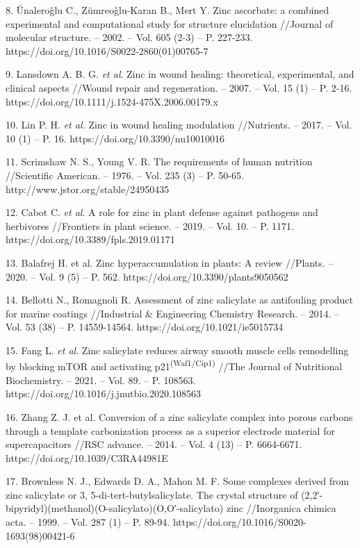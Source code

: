 \begin{noparindent}
8.
  Ünaleroǧlu C., Zümreoǧlu-Karan B., Mert Y. Zinc ascorbate: a combined
  experimental and computational study for structure elucidation
  //Journal of molecular structure. -- 2002. -- Vol. 605 (2-3) -- P.
  227-233. https://doi.org/10.1016/S0022-2860(01)00765-7

9.
  Lansdown A. B. G. \emph{et al}. Zinc in wound healing: theoretical,
  experimental, and clinical aspects //Wound repair and regeneration. --
  2007. -- Vol. 15 (1) -- P. 2-16.
  https://doi.org/10.1111/j.1524-475X.2006.00179.x

10.
  Lin P. H. \emph{et al.} Zinc in wound healing modulation //Nutrients.
  -- 2017. -- Vol. 10 (1) -- P. 16. https://doi.org/10.3390/nu10010016

11.
  Scrimshaw N. S., Young V. R. The requirements of human nutrition
  //Scientific American. -- 1976. -- Vol. 235 (3) -- P. 50-65.
  http://www.jstor.org/stable/24950435

12.
  Cabot C. \emph{et al}. A role for zinc in plant defense against
  pathogens and herbivores //Frontiers in plant science. -- 2019. --
  Vol. 10. -- P. 1171. https://doi.org/10.3389/fpls.2019.01171

13.
  Balafrej H. et al. Zinc hyperaccumulation in plants: A review
  //Plants. -- 2020. -- Vol. 9 (5) -- P. 562.
  https://doi.org/10.3390/plants9050562

14.
  Bellotti N., Romagnoli R. Assessment of zinc salicylate as antifouling
  product for marine coatings //Industrial \& Engineering Chemistry
  Research. -- 2014. -- Vol. 53 (38) -- P. 14559-14564.
  https://doi.org/10.1021/ie5015734

15.
  Fang L. \emph{et al}. Zinc salicylate reduces airway smooth muscle
  cells remodelling by blocking mTOR and activating
  p21\textsuperscript{(Waf1/Cip1)} //The Journal of Nutritional
  Biochemistry. -- 2021. -- Vol. 89. -- P. 108563.
  https://doi.org/10.1016/j.jnutbio.2020.108563

16.
  Zhang Z. J. et al. Conversion of a zinc salicylate complex into porous
  carbons through a template carbonization process as a superior
  electrode material for supercapacitors //RSC advance. -- 2014. -- Vol.
  4 (13) -- P. 6664-6671. https://doi.org/10.1039/C3RA44981E

17.
  Brownless N. J., Edwards D. A., Mahon M. F. Some complexes derived
  from zinc salicylate or 3, 5-di-tert-butylsalicylate. The crystal
  structure of (2,2′-bipyridyl)(methanol)(O-salicylato)(O,O′-salicylato)
  zinc //Inorganica chimica acta. -- 1999. -- Vol. 287 (1) -- P. 89-94.
  https://doi.org/10.1016/S0020-1693(98)00421-6


\end{noparindent}
